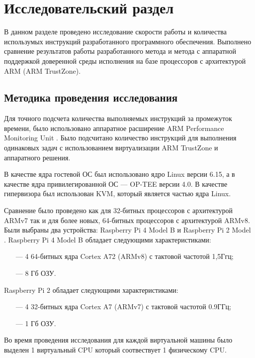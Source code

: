 \section{Исследовательский раздел}

В данном разделе проведено исследование скорости работы и количества использумых инструкций разработанного программного обеспечения. Выполнено сравнение результатов работы разработанного метода и метода с аппаратной поддержкой доверенной среды исполнения на базе процессоров с архитектурой ARM (ARM TrustZone).

\subsection{Методика проведения исследования}

Для точного подсчета количества выполняемых инструкций за промежуток времени, было использовано аппаратное расширение ARM Performance Monitoring Unit \cite{arm-performance-monitor}. Было подсчитано количество инструкций для выполнения одинаковых задач с использованием виртуализации ARM TrustZone и аппаратного решения.

В качестве ядра гостевой ОС был использовано ядро Linux версии 6.15, а в качестве ядра привилегированной ОС --- OP-TEE версии 4.0. В качестве гипервизора был использован KVM, который является частью ядра Linux.

Сравнение было проведено как для 32-битных процессоров с архитектурой ARMv7 так и для более новых, 64-битных процессоров с архитектурой ARMv8. Были выбраны два устройства: Raspberry Pi 4 Model B \cite{rpi4-b} и Raspberry Pi 2 Model \cite{rpi2-b}. Raspberry Pi 4 Model B обладает следующими характеристиками:

\begin{itemize}
	\item [---] 4 64-битных ядра Cortex A72 (ARMv8) с тактовой частотой 1,5Ггц;
	\item [---] 8 Гб ОЗУ.
\end{itemize}

Raspberry Pi 2 обладает следующими характеристиками:

\begin{itemize}
	\item [---] 4 32-битных ядра Cortex A7 (ARMv7) с тактовой частотой 0.9ГГц;
	\item [---] 1 Гб ОЗУ.
\end{itemize}

Во время проведения исследования для каждой виртуальной машины было выделен 1 виртуальный CPU который соотвествует 1 физическому CPU.

